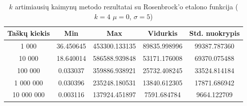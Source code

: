 \begin{table}[H]
    \centering
    \begin{tabular}{|c|c|c|c|c|}
        \hline
        \textbf{Taškų kiekis} & \textbf{Min} & \textbf{Max} & \textbf{Vidurkis} & \textbf{Std. nuokrypis} \\ \hline
        1 000        & 36.450645 & 453300.133135 & 89835.998996 & 99387.787360 \\ \hline
        10 000       & 18.640014 & 586588.939848 & 53171.176008 & 69370.075488 \\ \hline
        100 000      & 0.033037 & 359886.938921 & 25732.408245 & 33524.814184 \\ \hline
        1 000 000    & 0.030396 & 235248.180531 & 13840.612305 & 17871.686942 \\ \hline
        10 000 000   & 0.003116 & 137924.451897 & 7591.684784 & 9664.122709 \\ \hline
    \end{tabular}
    \caption{$k$ artimiausių kaimynų metodo rezultatai su Rosenbrock'o etalono funkcija ($k = 4$ $\mu = 0$, $\sigma = 5$)}
\end{table}